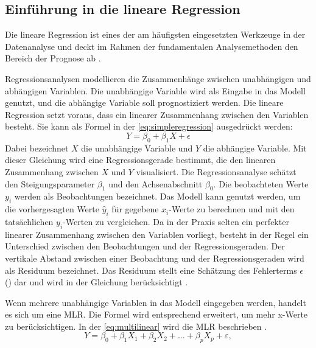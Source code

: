 \subsection{Einführung in die lineare Regression}
\label{einfuehrungInDieRegression}
Die lineare Regression ist eines der am häufigsten eingesetzten Werkzeuge in der Datenanalyse und deckt im Rahmen der fundamentalen Analysemethoden den Bereich der Prognose ab \cite{frick2021data}.  \par
Regressionsanalysen modellieren die Zusammenhänge zwischen unabhängigen und abhängigen Variablen. Die unabhängige Variable wird als Eingabe in das Modell genutzt, und die abhängige Variable soll prognostiziert werden. Die lineare Regression setzt voraus, dass ein linearer Zusammenhang zwischen den Variablen besteht. Sie kann als Formel in der \autoref{eq:simpleregression} \cite{frick2021data} ausgedrückt werden: 
\begin{equation}
Y = \beta_0 + \beta_1 X + \epsilon \tag{3.1}
\label{eq:simpleregression}
\end{equation}
Dabei bezeichnet \(X\) die unabhängige Variable und \(Y\) die abhängige Variable. Mit dieser Gleichung wird eine Regressionsgerade bestimmt, die den linearen Zusammenhang zwischen \(X\) und \(Y\) visualisiert. Die Regressionsanalyse schätzt den Steigungsparameter \(\beta_1\) und den Achsenabschnitt \(\beta_0\). Die beobachteten Werte \(y_i\) werden als Beobachtungen bezeichnet. Das Modell kann genutzt werden, um die vorhergesagten Werte \(\hat{y}_i\) für gegebene \(x_i\)-Werte zu berechnen und mit den tatsächlichen \(y_i\)-Werten zu vergleichen. Da in der Praxis selten ein perfekter linearer Zusammenhang zwischen den Variablen vorliegt, besteht in der Regel ein Unterschied zwischen den Beobachtungen und der Regressionsgeraden. Der vertikale Abstand zwischen einer Beobachtung und der Regressionsgeraden wird als Residuum bezeichnet. Das Residuum stellt eine Schätzung des Fehlerterms $\epsilon$ () dar und wird in der Gleichung berücksichtigt \cite{frick2021data}.  \par
Wenn mehrere unabhängige Variablen in das Modell eingegeben werden, handelt es sich um eine \ac{MLR}. Die Formel wird entsprechend erweitert, um mehr x-Werte zu berücksichtigen. In der \autoref{eq:multilinear} wird die \ac{MLR} beschrieben \cite{frick2021data}. 
\begin{equation}
Y = \beta_0 + \beta_1 X_{1} + \beta_2 X_{2} + \dots + \beta_p X_{p} + \varepsilon, \tag{3.2}
\label{eq:multilinear}
\end{equation}
